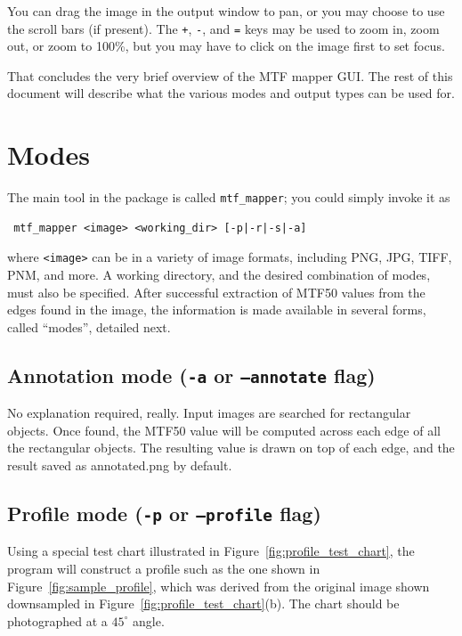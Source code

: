 \documentclass[a4paper]{article}
\begin{document}
You can drag the image in the output window to pan, or you may choose to use
the scroll bars (if present). The \verb-+-, \verb+-+, and \verb+=+ keys may
be used to zoom in, zoom out, or zoom to 100\%, but you may have to click on
the image first to set focus.

That concludes the very brief overview of the MTF mapper GUI. The rest of
this document will describe what the various modes and output types can be
used for.

\section{Modes}
The main tool in the package is called \texttt{mtf\_mapper}; you could simply
invoke it as 
\begin{verbatim} mtf_mapper <image> <working_dir> [-p|-r|-s|-a]
\end{verbatim}
where \texttt{<image>} can be in a variety of image formats, including 
PNG, JPG, TIFF, PNM, and more. A working directory, and the desired
combination of modes, must also be specified.
After successful extraction of MTF50 values from the edges found in 
the image, the information is made available in several forms, called 
``modes'', detailed next.

\subsection{Annotation mode (\texttt{-a} or \texttt{--annotate} flag)}
\label{sec:annotation_mode}
No explanation required, really. Input images are searched for rectangular
objects. Once found, the MTF50 value will be computed across each edge of
all the rectangular objects. The resulting value is drawn on top of each
edge, and the result saved as \textrm{annotated.png} by default.

\subsection{Profile mode (\texttt{-p} or \texttt{--profile} flag)}
\label{sec:profile_mode}
Using a special test chart illustrated in Figure~\ref{fig:profile_test_chart}, 
the program will construct a profile such as the one shown in 
Figure~\ref{fig:sample_profile}, which was derived from the original image
shown downsampled in Figure~\ref{fig:profile_test_chart}(b). The chart should
be photographed at a $45^\circ$ angle.
\end{document}
